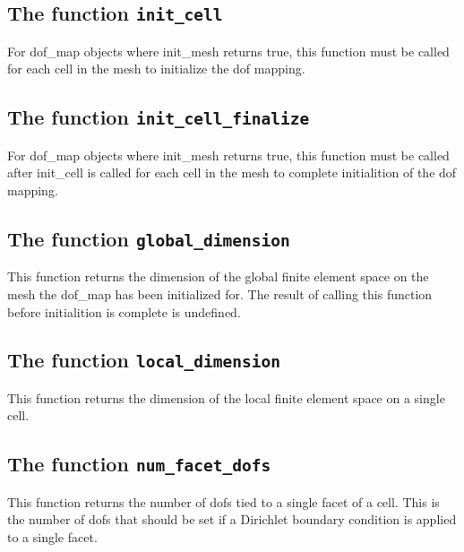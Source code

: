 
\subsection{The function \texttt{init\_cell}}
For dof\_map objects where init\_mesh returns true,
this function must be called for each cell in the mesh
to initialize the dof mapping.


\subsection{The function \texttt{init\_cell\_finalize}}
For dof\_map objects where init\_mesh returns true,
this function must be called after init\_cell is called for each cell in the mesh
to complete initialition of the dof mapping.


\subsection{The function \texttt{global\_dimension}}
This function returns the dimension of the global finite element space on the mesh
the dof\_map has been initialized for.
The result of calling this function before initialition is complete is undefined.


\subsection{The function \texttt{local\_dimension}}
This function returns the dimension of the local finite element space on a single cell.


\subsection{The function \texttt{num\_facet\_dofs}}
This function returns the number of dofs tied to a single facet of a cell.
This is the number of dofs that should be set if a Dirichlet boundary condition is applied to a single facet.

